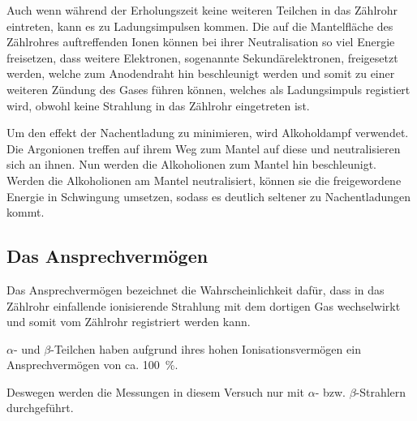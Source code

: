 Auch wenn während der Erholungszeit keine weiteren Teilchen in das Zählrohr eintreten, kann es zu 
Ladungsimpulsen kommen. Die auf die Mantelfläche des Zählrohres auftreffenden Ionen können bei 
ihrer Neutralisation so viel Energie freisetzen, dass weitere Elektronen, sogenannte Sekundärelektronen, 
freigesetzt werden, welche zum Anodendraht hin beschleunigt werden und somit zu einer weiteren 
Zündung des Gases führen können, welches als Ladungsimpuls registiert wird, obwohl keine Strahlung 
in das Zählrohr eingetreten ist.

Um den effekt der Nachentladung zu minimieren, wird Alkoholdampf verwendet. Die Argonionen treffen 
auf ihrem Weg zum Mantel auf diese und neutralisieren sich an ihnen. Nun werden die Alkoholionen zum 
Mantel hin beschleunigt. Werden die Alkoholionen am Mantel neutralisiert, können sie die freigewordene 
Energie in Schwingung umsetzen, sodass es deutlich seltener zu Nachentladungen kommt.
%
\subsection{Das Ansprechvermögen}
%
Das Ansprechvermögen bezeichnet die Wahrscheinlichkeit dafür, dass in das 
Zählrohr einfallende ionisierende Strahlung mit dem dortigen Gas wechselwirkt 
und somit vom Zählrohr registriert werden kann.

$\alpha$- und $\beta$-Teilchen haben aufgrund ihres hohen Ionisationsvermögen ein 
Ansprechvermögen von ca. \SI{100}{\percent}.

Deswegen werden die Messungen in diesem Versuch nur mit $\alpha$- bzw. $\beta$-Strahlern 
durchgeführt.

\FloatBarrier
%